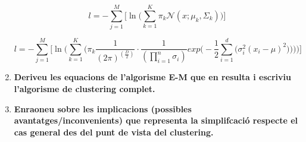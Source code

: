 \documentclass[a5paper]{article}
\begin{document}
\begin{enumerate}
\begin{equation*}
l = -\sum_{j = 1}^{M} \Bigg[ 
\ln\Big(
\sum_{k = 1}^{K} \pi_k \mathcal{N}(x; \mu_k, \Sigma_k)
\Big)
\Bigg] 
\end{equation*}


\begin{equation*}
l = -\sum_{j = 1}^{M} \Bigg[ 
\ln\Big(
\sum_{k = 1}^{K}
\big(
    \pi_k \frac{1}{(2\pi)^{(\frac{D}{2})}} \cdot \frac{1}{(\prod_{i = 1}^n \sigma_i)} exp\Bigg( -\frac{1}{2} \sum_{i = 1}^{d} \Big( \sigma_i^2(x_i - \mu)^2 \Big) \Bigg)
\big)
\Big)
\Bigg] 
\end{equation*}

\item \textbf{Deriveu les equacions de l'algorisme E-M que en resulta i escriviu l'algorisme de clustering complet.
}
\item \textbf{Enraoneu sobre les implicacions (possibles avantatges/inconvenients) que representa la simplifcació
respecte el cas general des del punt de vista del clustering.
}
\end{enumerate}
\end{document}
